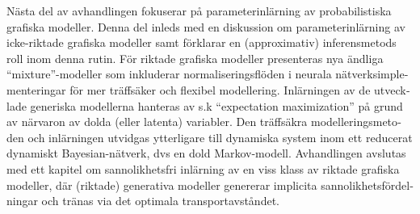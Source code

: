 \begin{otherlanguage}{swedish}
Nästa del av avhandlingen fokuserar på parameterinlärning av probabilistiska grafiska modeller. Denna del inleds med en diskussion om parameterinlärning av icke-riktade grafiska modeller samt förklarar en (approximativ) inferensmetods roll inom denna rutin. För riktade grafiska modeller presenteras nya ändliga ``mixture''-modeller som inkluderar normaliseringsflöden i neurala nätverksimplementeringar för mer träffsäker och flexibel modellering. Inlärningen av de utvecklade generiska modellerna hanteras av s.k ``expectation maximization'' på grund av närvaron av dolda (eller latenta) variabler. Den träffsäkra modelleringsmetoden och inlärningen utvidgas ytterligare till dynamiska system inom ett reducerat dynamiskt Bayesian-nätverk, dvs en dold Markov-modell. Avhandlingen avslutas med ett kapitel om sannolikhetsfri inlärning av en viss klass av riktade grafiska modeller, där (riktade) generativa modeller genererar implicita sannolikhetsfördelningar och tränas via det optimala transportavståndet.
\end{otherlanguage}

